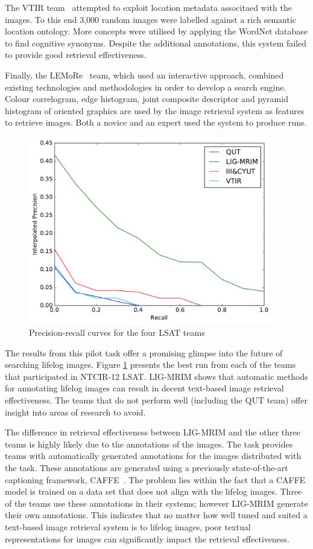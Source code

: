 The VTIR team~\cite{xia2016vtir} attempted to exploit location metadata associtaed with the images. To this end 3,000 random images were labelled against a rich semantic location ontology. More concepts were utilised by applying the WordNet database to find cognitive synonyms. Despite the additional annotations, this system failed to provide good retrieval effectiveness.

Finally, the LEMoRe~\cite{de40lemore} team, which used an interactive approach, combined existing technologies and methodologies in order to develop a search engine. Colour correlogram, edge histogram, joint composite descriptor and pyramid histogram of oriented graphics are used by the image retrieval system as features to retrieve images. Both a novice and an expert used the system to produce runs.

\begin{figure}[h]
    \centering
    \includegraphics[width=0.95\textwidth]{graphs/ntcir-pr-curve}
    \caption{Precision-recall curves for the four LSAT teams}
    \label{fig:ntcir-results}
\end{figure}

The results from this pilot task offer a promising glimpse into the future of searching lifelog images. Figure \ref{fig:ntcir-results} presents the best run from each of the teams that participated in NTCIR-12 LSAT. LIG-MRIM shows that automatic methods for annotating lifelog images can result in decent text-based image retrieval effectiveness. The teams that do not perform well (including the QUT team) offer insight into areas of research to avoid. 

The difference in retrieval effectiveness between LIG-MRIM and the other three teams is highly likely due to the annotations of the images. The task provides teams with automatically generated annotations for the images distributed with the task. These annotations are generated using a previously state-of-the-art captioning framework, CAFFE~\cite{jia2014caffe}. The problem lies within the fact that a CAFFE model is trained on a data set that does not align with the lifelog images. Three of the teams use these annotations in their systems; however LIG-MRIM generate their own annotations. This indicates that no matter how well tuned and suited a text-based image retrieval system is to lifelog images, poor textual representations for images can significantly impact the retrieval effectiveness.